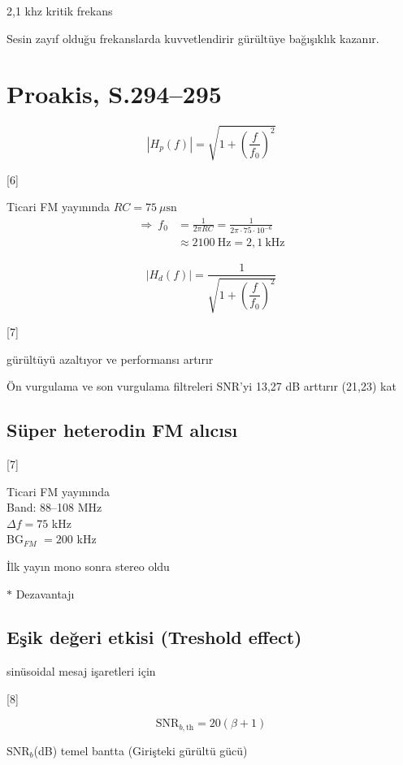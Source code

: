 \documentclass[11pt,a4paper]{article}
\begin{document}
2,1 khz kritik frekans

Sesin zayıf olduğu frekanslarda kuvvetlendirir gürültüye bağışıklık kazanır.

\section{Proakis, S.294--295}
\[ |H_p(f)| = \sqrt{1+\left(\frac{f}{f_0}\right)^2} \]

[6]

Ticari FM yayınında $RC=75\ \mu\mathrm{sn}$
\begin{align*}
\Rightarrow\ f_0 &= \frac{1}{2\pi RC} = \frac{1}{2\pi\cdot 75\cdot 10^{-6}} \\
&\approx 2100\ \mathrm{Hz} = 2{,}1\ \mathrm{kHz}
\end{align*}

\[ |H_d(f)| = \frac{1}{\sqrt{1+\left(\dfrac{f}{f_0}\right)^2}} \]

[7]

gürültüyü azaltıyor ve performansı artırır

Ön vurgulama ve son vurgulama filtreleri SNR'yi 13,27 dB arttırır (21,23) kat

\subsection{Süper heterodin FM alıcısı}

[7]

Ticari FM yayınında \\
Band: 88--108 MHz \\
$\Delta f = 75$ kHz \\
BG$_{FM}$ $= 200$ kHz


İlk yayın mono sonra stereo oldu

$\ast$ Dezavantajı
\subsection{Eşik değeri etkisi (Treshold effect)}
sinüsoidal mesaj işaretleri için

[8]

\[ \mathrm{SNR}_{b,\mathrm{th}} = 20(\beta+1) \]

$\mathrm{SNR}_b$(dB) \quad temel bantta \quad (Girişteki gürültü gücü)
\end{document}
